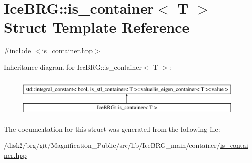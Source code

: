 \hypertarget{structIceBRG_1_1is__container}{}\section{Ice\+B\+R\+G\+:\+:is\+\_\+container$<$ T $>$ Struct Template Reference}
\label{structIceBRG_1_1is__container}


{\ttfamily \#include $<$is\+\_\+container.\+hpp$>$}

Inheritance diagram for Ice\+B\+R\+G\+:\+:is\+\_\+container$<$ T $>$\+:\begin{figure}[H]
\begin{center}
\leavevmode
\includegraphics[height=2.000000cm]{structIceBRG_1_1is__container}
\end{center}
\end{figure}


The documentation for this struct was generated from the following file\+:\begin{DoxyCompactItemize}
\item 
/disk2/brg/git/\+Magnification\+\_\+\+Public/src/lib/\+Ice\+B\+R\+G\+\_\+main/container/\hyperlink{is__container_8hpp}{is\+\_\+container.\+hpp}\end{DoxyCompactItemize}

